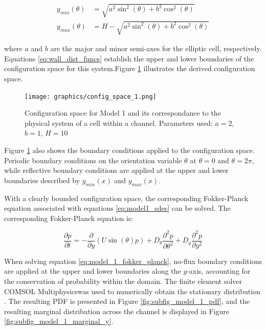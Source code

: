 \begin{subequations}\label{eq:wall_dist_funcs}
    \begin{align}
        y_{min}(\theta) &= \sqrt{a^2\sin^2(\theta) + b^2\cos^2(\theta)} \\
        y_{max}(\theta) &= H - \sqrt{a^2\sin^2(\theta) + b^2\cos^2(\theta)}
    \end{align}
\end{subequations}

where $a$ and $b$ are the major and minor semi-axes for the elliptic cell, respectively. 
Equations \eqref{eq:wall_dist_funcs} establish the upper and lower boundaries of the configuration space for this
system.Figure \ref{fig:configuration_space_model_1} illustrates the derived configuration space.

\begin{figure}[htbp]
    \centering
    \texttt{[image: graphics/config\_space\_1.png]}
    \caption{Configuration space for Model 1 and its correspondance to 
    the physical system of a cell within a channel. Parameters used: $a=2$, $b=1$, $H=10$}
    \label{fig:configuration_space_model_1}
\end{figure}

Figure \ref{fig:configuration_space_model_1} also shows the boundary conditions 
applied to the configuration space. Periodic boundary conditions on the orientation variable
$\theta$ at $\theta=0$ and $\theta=2\pi$, while reflective boundary conditions are applied
at the upper and lower boundaries described by $y_{min}(x)$ and $y_{max}(x)$.

With a clearly bounded configuration space, the corresponding 
Fokker-Planck equation associated with equations \eqref{eq:model1_sdes} can be solved. The corresponding Fokker-Planck
equation is:

\begin{equation}\label{eq:model_1_fokker_planck}
    \frac{\partial p}{\partial t} = -\frac{\partial}{\partial y} (U\sin(\theta) p) 
    + D_{\theta} \frac{\partial^2 p}{\partial \theta^2} 
    + D_y \frac{\partial^2 p}{\partial y^2}
\end{equation}


When solving equation \eqref{eq:model_1_fokker_planck}, no-flux boundary conditions are applied at the upper and lower
boundaries along the $y$-axis, accounting for the conservation of probability within the domain. 
The finite element solver COMSOL Multiphysics\textregistered was used to numerically obtain the stationary distribution 
\cite{comsol}. The resulting PDF is presented in Figure \ref{fig:subfig_model_1_pdf}, and the resulting marginal 
distribution across the channel is displayed in Figure \ref{fig:subfig_model_1_marginal_y}.


